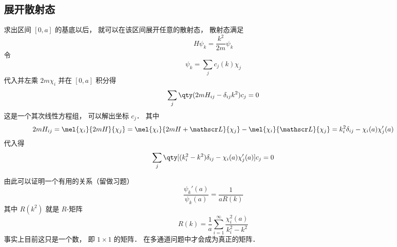 \subsection{展开散射态}
求出区间 $[0,a]$ 的基底以后， 就可以在该区间展开任意的散射态， 散射态满足
\begin{equation}\label{Rmat_eq4}
H\psi_k = \frac{k^2}{2m}\psi_k
\end{equation}
令
\begin{equation}\label{Rmat_eq5}
\psi_k = \sum_j c_j(k)\chi_j
\end{equation}
代入并左乘 $2m\chi_i$ 并在 $[0,a]$ 积分得
\begin{equation}
\sum_j \qty(2mH_{ij} - \delta_{ij}k^2) c_j = 0
\end{equation}
这是一个其次线性方程组， 可以解出坐标 $c_j$． 其中
\begin{equation}
2mH_{ij} = \mel{\chi_i}{2mH}{\chi_j} = \mel{\chi_i}{2mH + \mathscr L}{\chi_j} - \mel{\chi_i}{\mathscr L}{\chi_j} 
= k_i^2\delta_{ij} - \chi_i(a)\chi'_j(a)
\end{equation}
代入得
\begin{equation}
\sum_j \qty[(k_i^2 - k^2)\delta_{ij} - \chi_i(a)\chi'_j(a)] c_j = 0
\end{equation}

由此可以证明一个有用的关系（留做习题）
\begin{equation}
\frac{\psi_k'(a)}{\psi_k(a)} = \frac{1}{aR(k)}
\end{equation}
其中 $R(k^2)$ 就是 $R$-矩阵
\begin{equation}
R(k) = \frac{1}{a} \sum_{i=1}^\infty \frac{\chi_i^2(a)}{k_i^2 - k^2}
\end{equation}
事实上目前这只是一个数， 即 $1\times 1$ 的矩阵． 在多通道问题中才会成为真正的矩阵．
